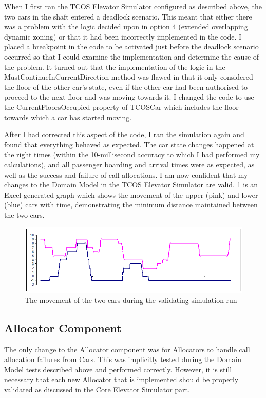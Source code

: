\documentclass{UoYCSproject}
\begin{document}
When I first ran the TCOS Elevator Simulator configured as described above, the two cars in the shaft entered a deadlock scenario.  This meant that either there was a problem with the logic decided upon in option 4 (extended overlapping dynamic zoning) or that it had been incorrectly implemented in the code.  I placed a breakpoint in the code to be activated just before the deadlock scenario occurred so that I could examine the implementation and determine the cause of the problem.  It turned out that the implementation of the logic in the MustContinueInCurrentDirection method was flawed in that it only considered the floor of the other car's state, even if the other car had been authorised to proceed to the next floor and was moving towards it.  I changed the code to use the CurrentFloorsOccupied property of TCOSCar which includes the floor towards which a car has started moving.

After I had corrected this aspect of the code, I ran the simulation again and found that everything behaved as expected.  The car state changes happened at the right times (within the 10-millisecond accuracy to which I had performed my calculations), and all passenger boarding and arrival times were as expected, as well as the success and failure of call allocations.  I am now confident that my changes to the Domain Model in the TCOS Elevator Simulator are valid.  \ref{tcosvalidationgraph} is an Excel-generated graph which shows the movement of the upper (pink) and lower (blue) cars with time, demonstrating the minimum distance maintained between the two cars.

\begin{figure} [h]
	\centering
	\includegraphics{tcos_validation_movement_graph.png}
	\caption{The movement of the two cars during the validating simulation run}
	\label{tcosvalidationgraph}
\end{figure}

\subsection{Allocator Component}
The only change to the Allocator component was for Allocators to handle call allocation failures from Cars.  This was implicitly tested during the Domain Model tests described above and performed correctly.  However, it is still necessary that each new Allocator that is implemented should be properly validated as discussed in the Core Elevator Simulator part.
\end{document}

